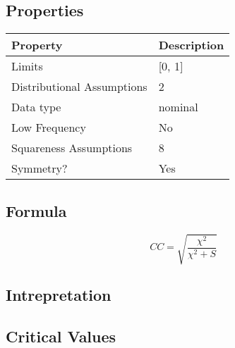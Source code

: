 \documentclass[11pt]{article}
\begin{document}
\subsection{Properties}
\begin{tabular}{| l || l |}
    \hline
    {\bf Property} & {\bf Description} \\
    \hline
    Limits & [0, 1] \\ \hline

    Distributional Assumptions& 2 \\ \hline

    Data type & nominal \\ \hline

    Low Frequency & No \\ \hline

    Squareness Assumptions & 8 \\ \hline
    
    Symmetry? & Yes \\ \hline

\end{tabular}


\subsection{Formula}
$$
CC = \sqrt{ \frac{ \chi^2 }{ \chi^2 + S } }
$$

\subsection{Intrepretation}

\subsection{Critical Values}
\end{document}
